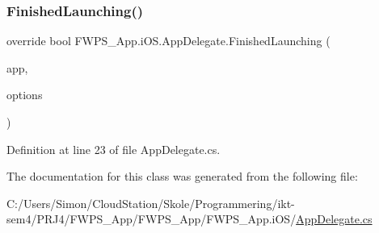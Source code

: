 \subsubsection{\texorpdfstring{Finished\+Launching()}{FinishedLaunching()}}
{\footnotesize\ttfamily override bool F\+W\+P\+S\+\_\+\+App.\+i\+O\+S.\+App\+Delegate.\+Finished\+Launching (\begin{DoxyParamCaption}\item[{U\+I\+Application}]{app,  }\item[{N\+S\+Dictionary}]{options }\end{DoxyParamCaption})}



Definition at line 23 of file App\+Delegate.\+cs.



The documentation for this class was generated from the following file\+:\begin{DoxyCompactItemize}
\item 
C\+:/\+Users/\+Simon/\+Cloud\+Station/\+Skole/\+Programmering/ikt-\/sem4/\+P\+R\+J4/\+F\+W\+P\+S\+\_\+\+App/\+F\+W\+P\+S\+\_\+\+App/\+F\+W\+P\+S\+\_\+\+App.\+i\+O\+S/\mbox{\hyperlink{_app_delegate_8cs}{App\+Delegate.\+cs}}\end{DoxyCompactItemize}
